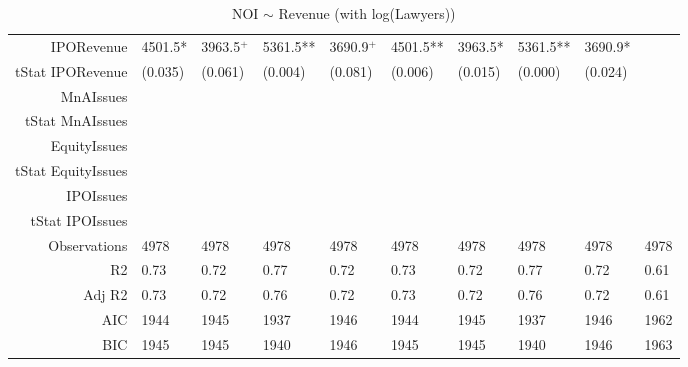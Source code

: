 \begin{table}[ht]
\begin{tabular}{rlllllllll}
  IPORevenue & 4501.5* & 3963.5$^{+}$ & 5361.5** & 3690.9$^{+}$ & 4501.5** & 3963.5* & 5361.5** & 3690.9* &  \\ 
  tStat IPORevenue & (0.035) & (0.061) & (0.004) & (0.081) & (0.006) & (0.015) & (0.000) & (0.024) &  \\ 
  MnAIssues &  &  &  &  &  &  &  &  &  \\ 
  tStat MnAIssues &  &  &  &  &  &  &  &  &  \\ 
  EquityIssues &  &  &  &  &  &  &  &  &  \\ 
  tStat EquityIssues &  &  &  &  &  &  &  &  &  \\ 
  IPOIssues &  &  &  &  &  &  &  &  &  \\ 
  tStat IPOIssues &  &  &  &  &  &  &  &  &  \\ 
  Observations & 4978 & 4978 & 4978 & 4978 & 4978 & 4978 & 4978 & 4978 & 4978 \\ 
  R2 & 0.73 & 0.72 & 0.77 & 0.72 & 0.73 & 0.72 & 0.77 & 0.72 & 0.61 \\ 
  Adj R2 & 0.73 & 0.72 & 0.76 & 0.72 & 0.73 & 0.72 & 0.76 & 0.72 & 0.61 \\ 
  AIC & 1944 & 1945 & 1937 & 1946 & 1944 & 1945 & 1937 & 1946 & 1962 \\ 
  BIC & 1945 & 1945 & 1940 & 1946 & 1945 & 1945 & 1940 & 1946 & 1963 \\ 
   \hline
\end{tabular}
\caption{NOI $\sim$ Revenue (with log(Lawyers))} 
\end{table}
